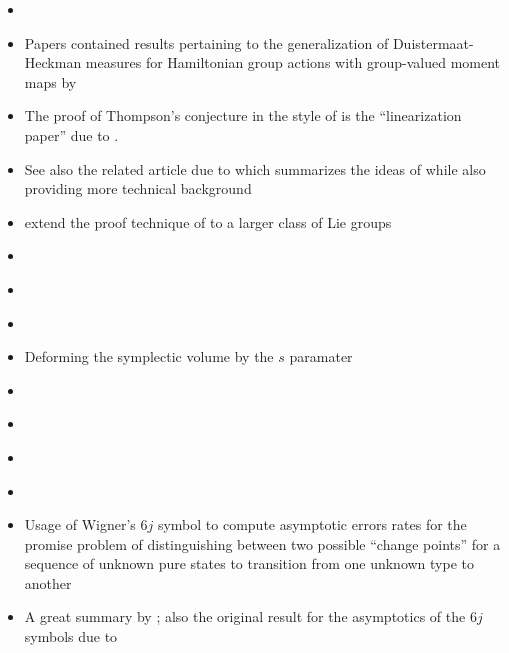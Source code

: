 \documentclass[notitlepage, 10pt]{article}
\begin{document}
\begin{itemize}
    \item \citeauthor{alekseev1997poisson} \cite{alekseev1997poisson}
    \item Papers contained results pertaining to the generalization of Duistermaat-Heckman measures for Hamiltonian group actions with group-valued moment maps by \citeauthor{alekseev2000group} \cite{alekseev1999duistermaat,alekseev2000group}
    \item The proof of Thompson's conjecture in the style of \citeauthor{alekseev2001linearization} is the ``linearization paper'' due to \cite{alekseev2001linearization}. 
    \item See also the related article due to \citeauthor{lamb2005proof} which summarizes the ideas of \cite{alekseev2001linearization} while also providing more technical background \cite{lamb2005proof}
    \item \citeauthor{lu2003thompson} extend the proof technique of \cite{alekseev2001linearization} to a larger class of Lie groups \cite{lu2003thompson}
    \item \citeauthor{alekseev2017symplectic} \cite{alekseev2017symplectic}
    \item \citeauthor{alekseev2017horn} \cite{alekseev2017horn}
    \item \citeauthor{alekseev2007ginzburg} \cite{alekseev2007ginzburg}
    \item Deforming the symplectic volume by the $s$ paramater \citeauthor{alekseev2018concentration} \cite{alekseev2018concentration}
    \item \citeauthor{klyachko2000random} \cite{klyachko2000random}
    \item \citeauthor{christandl2008quantum} \cite{christandl2008quantum}
    \item \citeauthor{christandl2018recoupling} \cite{christandl2018recoupling}
    \item \citeauthor{kirillov1990representations} \cite{kirillov1990representations}
    \item Usage of Wigner's $6j$ symbol to compute asymptotic errors rates for the promise problem of distinguishing between two possible ``change points'' for a sequence of unknown pure states to transition from one unknown type to another \cite{akimoto2011discrimination}
    \item A great summary by \citeauthor{roberts2002asymptotics} \cite{roberts2002asymptotics}; also the original result for the asymptotics of the $6j$ symbols due to  \citeauthor{roberts1999classical} \cite{roberts1999classical}

\end{itemize}
\end{document}
